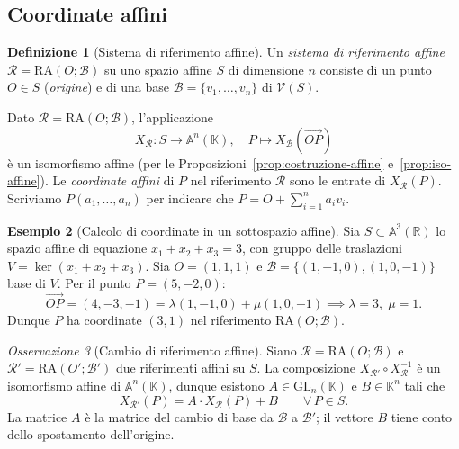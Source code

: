 \documentclass[11pt, a4paper]{book}
\theoremstyle{definition}
\newtheorem{definizione}{Definizione}[section]
\newtheorem{esempio}[definizione]{Esempio}
\theoremstyle{plain}
\theoremstyle{remark}
\newtheorem{osservazione}[definizione]{Osservazione}
\newcommand{\R}{\mathbb{R}}
\newcommand{\K}{\mathbb{K}}
\newcommand{\GL}{\mathrm{GL}}
\newcommand{\VV}{\mathcal{V}}   %
\newcommand{\RA}{\mathrm{RA}}   %
\begin{document}
\subsection{Coordinate affini}

\begin{defbox}
\begin{definizione}[Sistema di riferimento affine]
\label{def:rif-affine}
Un \emph{sistema di riferimento affine} $\mathcal{R} = \RA(O;\mathcal{B})$ su uno spazio affine $S$ di dimensione $n$ consiste di un punto $O \in S$ (\emph{origine}) e di una base $\mathcal{B} = \{v_1, \ldots, v_n\}$ di $\VV(S)$.
\end{definizione}
\end{defbox}

Dato $\mathcal{R} = \RA(O;\mathcal{B})$, l'applicazione
\[
  X_\mathcal{R} \colon S \to \mathbb{A}^n(\K), \quad P \mapsto X_\mathcal{B}(\overrightarrow{OP})
\]
è un isomorfismo affine (per le Proposizioni~\ref{prop:costruzione-affine} e~\ref{prop:iso-affine}). Le \emph{coordinate affini} di $P$ nel riferimento $\mathcal{R}$ sono le entrate di $X_\mathcal{R}(P)$. Scriviamo $P(a_1, \ldots, a_n)$ per indicare che $P = O + \sum_{i=1}^n a_i v_i$.

\begin{exbox}
\begin{esempio}[Calcolo di coordinate in un sottospazio affine]
Sia $S \subset \mathbb{A}^3(\R)$ lo spazio affine di equazione $x_1 + x_2 + x_3 = 3$, con gruppo delle traslazioni $V = \ker(x_1+x_2+x_3)$. Sia $O = (1,1,1)$ e $\mathcal{B} = \{(1,-1,0),(1,0,-1)\}$ base di $V$. Per il punto $P = (5,-2,0)$:
\[
  \overrightarrow{OP} = (4,-3,-1) = \lambda(1,-1,0) + \mu(1,0,-1) \implies \lambda = 3,\; \mu = 1.
\]
Dunque $P$ ha coordinate $(3,1)$ nel riferimento $\RA(O;\mathcal{B})$.
\end{esempio}
\end{exbox}

\begin{osservazione}[Cambio di riferimento affine]
Siano $\mathcal{R} = \RA(O;\mathcal{B})$ e $\mathcal{R}' = \RA(O';\mathcal{B}')$ due riferimenti affini su $S$. La composizione $X_{\mathcal{R}'} \circ X_\mathcal{R}^{-1}$ è un isomorfismo affine di $\mathbb{A}^n(\K)$, dunque esistono $A \in \GL_n(\K)$ e $B \in \K^n$ tali che
\[
  X_{\mathcal{R}'}(P) = A \cdot X_\mathcal{R}(P) + B \qquad \forall\, P \in S.
\]
La matrice $A$ è la matrice del cambio di base da $\mathcal{B}$ a $\mathcal{B}'$; il vettore $B$ tiene conto dello spostamento dell'origine.
\end{osservazione}
\end{document}
